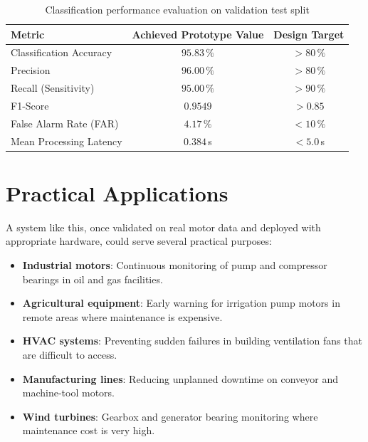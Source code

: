 \documentclass[12pt,a4paper]{article}
\begin{document}
\begin{table}[htbp]
\centering
\caption{Classification performance evaluation on validation test split}
\begin{tabular}{@{}lcc@{}}
\toprule
\textbf{Metric} & \textbf{Achieved Prototype Value} & \textbf{Design Target} \\
\midrule
Classification Accuracy & $95.83\,\%$ & $> 80\,\%$ \\
Precision               & $96.00\,\%$ & $> 80\,\%$ \\
Recall (Sensitivity)    & $95.00\,\%$ & $> 90\,\%$ \\
F1-Score                & $0.9549$    & $> 0.85$ \\
False Alarm Rate (FAR)  & $4.17\,\%$  & $< 10\,\%$ \\
Mean Processing Latency & $0.384$\,s  & $< 5.0$\,s \\
\bottomrule
\end{tabular}
\label{tab:results}
\end{table}

\section{Practical Applications}

A system like this, once validated on real motor data and deployed
with appropriate hardware, could serve several practical purposes:

\begin{itemize}
  \item \textbf{Industrial motors}: Continuous monitoring of pump
        and compressor bearings in oil and gas facilities.
  \item \textbf{Agricultural equipment}: Early warning for
        irrigation pump motors in remote areas where maintenance
        is expensive.
  \item \textbf{HVAC systems}: Preventing sudden failures in
        building ventilation fans that are difficult to access.
  \item \textbf{Manufacturing lines}: Reducing unplanned downtime
        on conveyor and machine-tool motors.
  \item \textbf{Wind turbines}: Gearbox and generator bearing
        monitoring where maintenance cost is very high.
\end{itemize}
\end{document}
